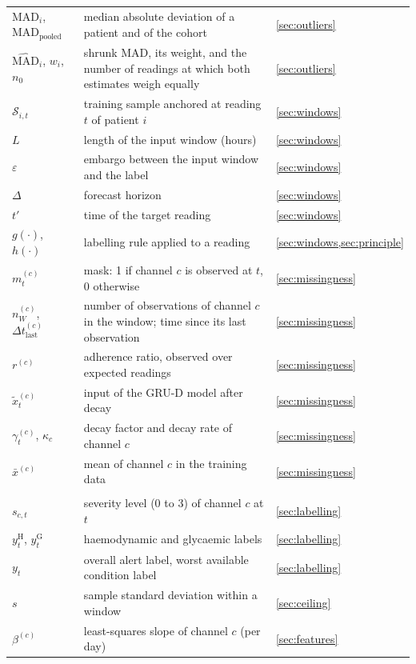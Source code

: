 {\begin{longtable}{@{}>{\raggedright\arraybackslash}p{2.6cm} >{\raggedright\arraybackslash}p{8.6cm} >{\raggedright\arraybackslash}p{2.9cm}@{}}
$\mathrm{MAD}_i$, $\mathrm{MAD}_{\text{pooled}}$ & median absolute deviation of a patient and of the cohort & \cref{sec:outliers} \\
$\widehat{\mathrm{MAD}}_i$, $w_i$, $n_0$ & shrunk MAD, its weight, and the number of readings at which both estimates weigh equally & \cref{sec:outliers} \\
$\mathcal{S}_{i,t}$ & training sample anchored at reading $t$ of patient $i$ & \cref{sec:windows} \\
$L$ & length of the input window (hours) & \cref{sec:windows} \\
$\varepsilon$ & embargo between the input window and the label & \cref{sec:windows} \\
$\Delta$ & forecast horizon & \cref{sec:windows} \\
$t'$ & time of the target reading & \cref{sec:windows} \\
$g(\cdot)$, $h(\cdot)$ & labelling rule applied to a reading & \cref{sec:windows,sec:principle} \\
$m^{(c)}_t$ & mask: 1 if channel $c$ is observed at $t$, 0 otherwise & \cref{sec:missingness} \\
$n^{(c)}_W$, $\Delta t^{(c)}_{\text{last}}$ & number of observations of channel $c$ in the window; time since its last observation & \cref{sec:missingness} \\
$r^{(c)}$ & adherence ratio, observed over expected readings & \cref{sec:missingness} \\
$\tilde x^{(c)}_t$ & input of the GRU-D model after decay & \cref{sec:missingness} \\
$\gamma^{(c)}_t$, $\kappa_c$ & decay factor and decay rate of channel $c$ & \cref{sec:missingness} \\
$\bar x^{(c)}$ & mean of channel $c$ in the training data & \cref{sec:missingness} \\
\addlinespace
\multicolumn{3}{@{}l}{\textit{Labels and features}} \\
$s_{c,t}$ & severity level (0 to 3) of channel $c$ at $t$ & \cref{sec:labelling} \\
$y^{\mathrm{H}}_t$, $y^{\mathrm{G}}_t$ & haemodynamic and glycaemic labels & \cref{sec:labelling} \\
$y_t$ & overall alert label, worst available condition label & \cref{sec:labelling} \\
$s$ & sample standard deviation within a window & \cref{sec:ceiling} \\
$\beta^{(c)}$ & least-squares slope of channel $c$ (per day) & \cref{sec:features} \\

\end{longtable}}
